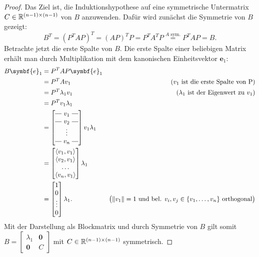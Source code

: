 \begin{proof}
    Das Ziel ist, die Induktionshypothese auf eine symmetrische Untermatrix \(C \in \mathbb{R}^{\left(n-1\right)\times\left(n-1\right)}\) von \(B\) anzuwenden.
    Dafür wird zunächst die Symmetrie von \(B\) gezeigt:   
    \begin{equation*}
        B^{T} = {\left(P^{T}AP\right)}^{T} = {\left(AP\right)}^{T}P = P^{T}A^{T}P \overset{A\text{ sym.}}{=} P^{T}AP = B.
    \end{equation*} 
    Betrachte jetzt die erste Spalte von \(B\). 
    Die erste Spalte einer beliebigen Matrix erhält man durch Multiplikation mit dem kanonischen Einheitsvektor \(\symbf{e}_1\): 
    \begin{align*}
        B\symbf{e}_1 &= P^{T}AP\symbf{e}_1 \\
        &= P^{T}Av_1 & \left(v_1 \text{ ist die erste Spalte von P}\right) \\
        &= P^{T}{\lambda}_1v_1 & \left({\lambda}_1\text{ ist der Eigenwert zu } v_1\right) \\
        &= P^{T}v_1{\lambda}_1 \\
        &= \brows{v_1 \\ v_2 \\ \rowsvdots \\ v_n}v_1{\lambda}_1 \\
        &= 
        \begin{bmatrix}
                \langle v_1,v_1 \rangle \\ \langle v_2,v_1 \rangle \\ \dots \\ \langle v_n,v_1 \rangle
        \end{bmatrix}
        {\lambda}_1 \\
        &=
        \begin{bmatrix}
            1  \\ 0 \\ \vdots \\ 0
        \end{bmatrix}
        {\lambda}_1. & \bigl(\norm{v_1} = 1 \text{ und bel. } v_i,v_j \in \{v_1,\ldots,v_n\} \text{ orthogonal}\bigr)
    \end{align*}
    Mit der Darstellung als Blockmatrix und durch Symmetrie von \(B\) gilt somit 
    \(
    B = 
    \begin{bmatrix}
        {\lambda}_1 & \symbf{0} \\
        \symbf{0} & C
    \end{bmatrix}
    \)
    mit \(C \in \mathbb{R}^{(n-1) \times (n-1)}\) symmetrisch.


\end{proof}
